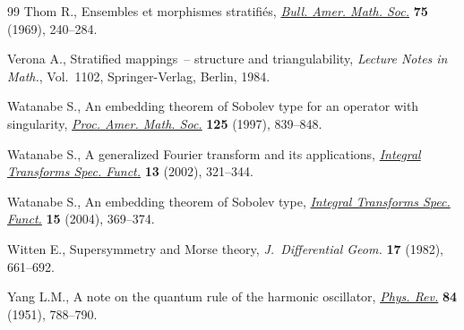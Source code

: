 \documentclass[pdftex]{sigma}
\begin{document}
\begin{thebibliography}{99}
Thom R., Ensembles et morphismes stratif\/i\'es, \href{http://dx.doi.org/10.1090/S0002-9904-1969-12138-5}{\textit{Bull. Amer. Math. Soc.}}
  \textbf{75} (1969), 240--284.

Verona A., Stratif\/ied mappings~-- structure and triangulability,
  \textit{Lecture Notes in Math.}, Vol.~1102, Springer-Verlag, Berlin,
  1984.

Watanabe S., An embedding theorem of {S}obolev type for an operator with
  singularity, \href{http://dx.doi.org/10.1090/S0002-9939-97-03642-3}{\textit{Proc. Amer. Math. Soc.}} \textbf{125} (1997), 839--848.

Watanabe S., A generalized {F}ourier transform and its applications,
  \href{http://dx.doi.org/10.1080/10652460213521}{\textit{Integral Transforms Spec. Funct.}} \textbf{13} (2002), 321--344.

Watanabe S., An embedding theorem of {S}obolev type, \href{http://dx.doi.org/10.1080/1065246042000210403a}{\textit{Integral
  Transforms Spec. Funct.}} \textbf{15} (2004), 369--374.

Witten E., Supersymmetry and {M}orse theory, \textit{J.~Differential Geom.}
  \textbf{17} (1982), 661--692.

Yang L.M., A note on the quantum rule of the harmonic oscillator, \href{http://dx.doi.org/10.1103/PhysRev.84.788}{\textit{Phys.
  Rev.}} \textbf{84} (1951), 788--790.

\end{thebibliography}\LastPageEnding
\end{document}
